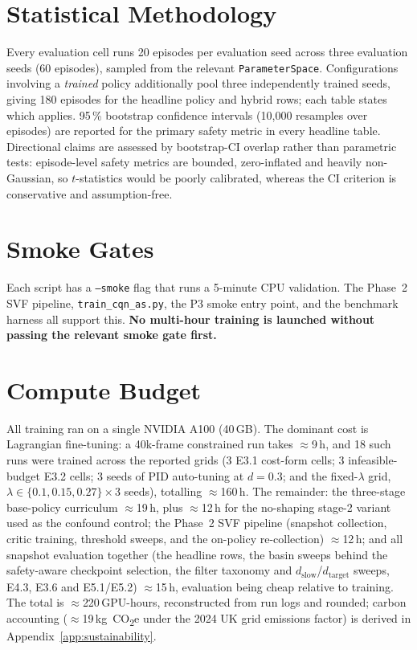 \documentclass[11pt,a4paper]{report}
\begin{document}
\section{Statistical Methodology}
\label{sec:setup:stats}

Every evaluation cell runs 20 episodes per evaluation seed across
three evaluation seeds (60 episodes), sampled from the relevant
\texttt{ParameterSpace}. Configurations involving a \emph{trained}
policy additionally pool three independently trained seeds, giving
180 episodes for the headline policy and hybrid rows; each table
states which applies. 95\,\% bootstrap confidence intervals
(10{,}000 resamples over episodes) are reported for the primary
safety metric in every headline table. Directional claims are
assessed by bootstrap-CI overlap rather than parametric tests:
episode-level safety metrics are bounded, zero-inflated and heavily
non-Gaussian, so $t$-statistics would be poorly calibrated, whereas
the CI criterion is conservative and assumption-free.

\section{Smoke Gates}
\label{sec:setup:smoke}

Each script has a \texttt{--smoke} flag that runs a 5-minute CPU
validation. The Phase~2 SVF pipeline,
\texttt{train\_cqn\_as.py}, the P3 smoke entry point, and the
benchmark harness all support this. \textbf{No multi-hour training
is launched without passing the relevant smoke gate first.}

\section{Compute Budget}
\label{sec:setup:compute}

All training ran on a single NVIDIA A100 (40\,GB). The dominant cost
is Lagrangian fine-tuning: a 40k-frame constrained run takes
$\approx$9\,h, and 18 such runs were trained across the reported
grids (3 E3.1 cost-form cells; 3 infeasible-budget E3.2 cells; 3
seeds of PID auto-tuning at $d = 0.3$; and the fixed-$\lambda$ grid,
$\lambda \in \{0.1, 0.15, 0.27\} \times 3$ seeds), totalling
$\approx$160\,h. The remainder: the three-stage base-policy
curriculum $\approx$19\,h, plus $\approx$12\,h for the no-shaping
stage-2 variant used as the confound control; the Phase~2 SVF
pipeline (snapshot collection, critic training, threshold sweeps,
and the on-policy re-collection) $\approx$12\,h; and all
snapshot evaluation together (the headline rows, the basin sweeps
behind the safety-aware checkpoint selection, the filter taxonomy
and $d_{\mathrm{slow}}$/$d_{\mathrm{target}}$ sweeps, E4.3, E3.6 and
E5.1/E5.2) $\approx$15\,h, evaluation being cheap relative to
training. The total is $\approx$220\,GPU-hours, reconstructed from
run logs and rounded; carbon accounting
($\approx$19\,kg~CO\textsubscript{2}e under the 2024 UK grid
emissions factor) is derived in Appendix~\ref{app:sustainability}.
\end{document}
